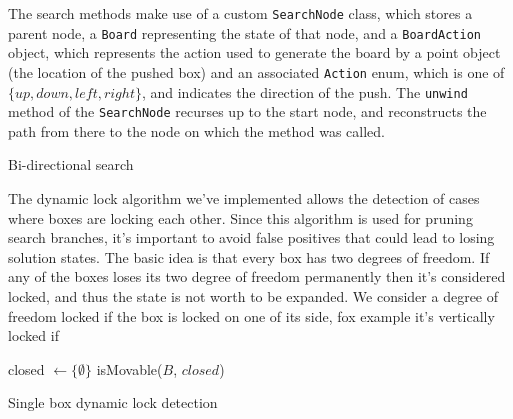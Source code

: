 \documentclass[a4paper,11pt]{article}
\begin{document}
The search methods make use of a custom \texttt{SearchNode} class, which stores
a parent node, a \texttt{Board} representing the state of that node, and a
\texttt{BoardAction} object, which represents the action used to generate the
board by a point object (the location of the pushed box) and an associated
\texttt{Action} enum, which is one of $\{up, down, left, right\}$, and indicates
the direction of the push. The \texttt{unwind} method of the \texttt{SearchNode}
recurses up to the start node, and reconstructs the path from there to the node
on which the method was called.

\begin{algorithm}
  \DontPrintSemicolon

\caption{Bi-directional search}
\label{alg:bidi}
\end{algorithm}

The dynamic lock algorithm we've implemented allows the detection of
cases where boxes are locking each other. Since this algorithm is used
for pruning search branches, it's important to avoid false positives
that could lead to losing solution states. The basic idea is that
every box has two degrees of freedom. If any of the boxes loses its
two degree of freedom permanently then it's considered locked, and
thus the state is not worth to be expanded. We consider a degree of
freedom locked if the box is locked on one of its side, fox example
it's vertically locked if 

\begin{algorithm}
  \DontPrintSemicolon
  closed $\longleftarrow \{\emptyset\}$\;
  \Return isMovable($B$, $closed$)

\caption{Single box dynamic lock detection}
\label{alg:singledynamiclock}
\end{algorithm}
\end{document}
